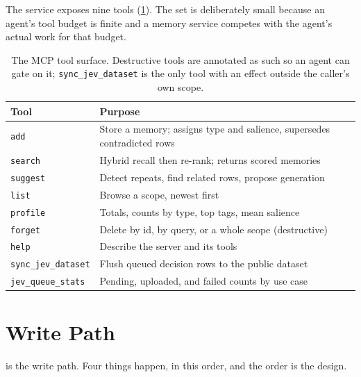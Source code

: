 \documentclass[10pt,twocolumn]{article}
\begin{document}
The service exposes nine tools (\cref{tab:tools}). The set is deliberately small
because an agent's tool budget is finite and a memory service competes with the
agent's actual work for that budget.

\begin{table}[t]
\caption{The MCP tool surface. Destructive tools are annotated as such so an
agent can gate on it; \texttt{sync\_jev\_dataset} is the only tool with an
effect outside the caller's own scope.}
\label{tab:tools}
\centering\footnotesize
\begin{tabular}{@{}lp{}@{}}
\toprule
Tool & Purpose \\
\midrule
\texttt{add}      & Store a memory; assigns type and salience, supersedes contradicted rows \\
\texttt{search}   & Hybrid recall then re-rank; returns scored memories \\
\texttt{suggest}  & Detect repeats, find related rows, propose generation \\
\texttt{list}     & Browse a scope, newest first \\
\texttt{profile}  & Totals, counts by type, top tags, mean salience \\
\texttt{forget}   & Delete by id, by query, or a whole scope (destructive) \\
\texttt{help}     & Describe the server and its tools \\
\texttt{sync\_jev\_dataset} & Flush queued decision rows to the public dataset \\
\texttt{jev\_queue\_stats}  & Pending, uploaded, and failed counts by use case \\
\bottomrule
\end{tabular}
\end{table}

\section{Write Path}
\label{sec:write}

 is the write path. Four things happen, in this order, and the
order is the design.
\end{document}
